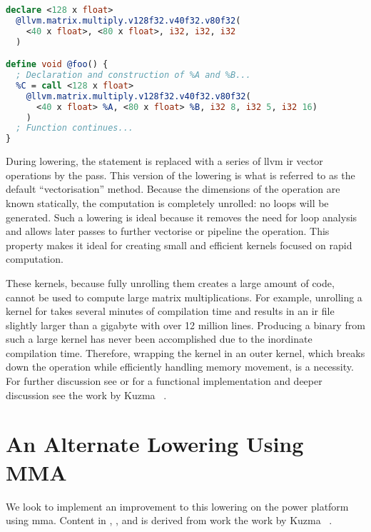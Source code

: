 \documentclass[\main/thesis.tex]{subfiles}
\begin{document}
\begin{lstlisting}[caption={[Example Declaration and Use of \code{llvm.matrix.multiply.*}]An example declaration and usage of the \code{llvm.matrix.multiply.*} intrinsic.},
      label=lst:matMulIntr,language=llvm,float,columns=flexible]
declare <128 x float>
  @llvm.matrix.multiply.v128f32.v40f32.v80f32(
    <40 x float>, <80 x float>, i32, i32, i32
  )

define void @foo() {
  ; Declaration and construction of %A and %B...
  %C = call <128 x float>
    @llvm.matrix.multiply.v128f32.v40f32.v80f32(
      <40 x float> %A, <80 x float> %B, i32 8, i32 5, i32 16)
    )
  ; Function continues...
}
\end{lstlisting}

During lowering, the  statement is replaced with a series of \gls{llvm} \gls{ir} vector operations by the  pass.
This version of the lowering is what is referred to as the default ``vectorisation'' method.
Because the dimensions of the operation are known statically, the computation is completely unrolled: no loops will be generated.
Such a lowering is ideal because it removes the need for loop analysis and allows later passes to further vectorise or pipeline the operation.
This property makes it ideal for creating small and efficient kernels focused on rapid computation.

These kernels, because fully unrolling them creates a large amount of code, cannot be used to compute large matrix multiplications.
For example, unrolling a kernel for  takes several minutes of compilation time and results in an \gls{ir} file slightly larger than a gigabyte with over 12 million lines.
Producing a binary from such a large kernel has never been accomplished due to the inordinate compilation time.
Therefore, wrapping the kernel in an outer kernel, which breaks down the operation while efficiently handling memory movement, is a necessity.
For further discussion see  or for a functional implementation and deeper discussion see the work by Kuzma \etal~\autocite{kuzma2021fast}.

\section{An Alternate Lowering Using MMA}
\label{sec:alternateLowering}
We look to implement an improvement to this lowering on the \gls{power} platform using \gls{mma}.
Content in , , and  is derived from work the work by Kuzma \etal~\autocite{kuzma2021fast}.
\end{document}
